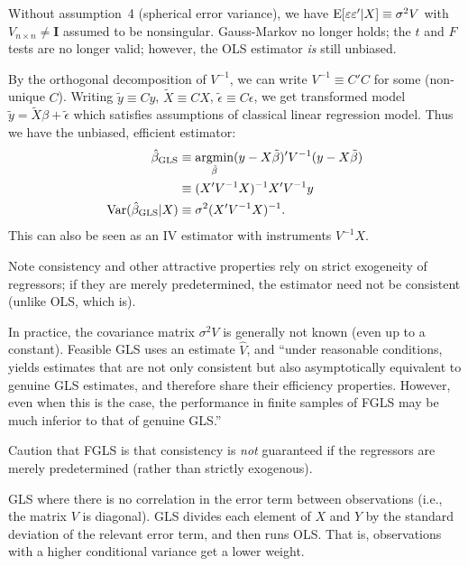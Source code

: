 \documentclass[8pt,letterpaper, landscape]{extarticle} %
\newcommand{\mI}{\ensuremath{\mathbf{I}}}
\begin{document}
\begin{multicols}{3}
\begin{description}
 Without assumption~4 (spherical error variance), we have $ \operatorname{E} [\varepsilon \varepsilon' | X] \equiv \sigma^2 V $ with $ V_{n \times n} \neq \mI $ assumed to be nonsingular. Gauss-Markov no longer holds; the $ t $ and $ F $ tests are no longer valid; however, the OLS estimator \textit{is} still unbiased.

By the orthogonal decomposition of $ V^{-1} $, we can write $ V^{-1} \equiv C' C $ for some (non-unique $ C $). Writing $ \tilde{y} \equiv Cy $, $ \tilde{X} \equiv CX $, $ \tilde{\epsilon} \equiv C \epsilon $, we get transformed model $ \tilde{y} = \tilde{X} \beta + \tilde{\epsilon} $ which satisfies assumptions of classical linear regression model. Thus we have the unbiased, efficient estimator:
\begin{align*}
\hat{\beta}_{\text{GLS}} &\equiv \operatorname*{argmin}_{\tilde{\beta}} (y - X \tilde{\beta})' V^{-1} (y - X \tilde{\beta}) \\
&\equiv (X' V^{-1} X)^{-1} X' V^{-1} y \\
\operatorname{Var} (\hat{\beta}_{\text{GLS}} | X) &\equiv \sigma^{2} (X' V^{-1} X)^{-1}.
\end{align*}
This can also be seen as an IV estimator with instruments $ V^{-1} X $.

Note consistency and other attractive properties rely on strict exogeneity of regressors; if they are merely predetermined, the estimator need not be consistent (unlike OLS, which is).

 In practice, the covariance matrix $ \sigma^2 V $ is generally not known (even up to a constant). Feasible GLS uses an estimate $ \widehat{V} $, and ``under reasonable conditions, yields estimates that are not only consistent but also asymptotically equivalent to genuine GLS estimates, and therefore share their efficiency properties. However, even when this is the case, the performance in finite samples of FGLS may be much inferior to that of genuine GLS.''

Caution that FGLS is that consistency is \textit{not} guaranteed if the regressors are merely predetermined (rather than strictly exogenous).

 GLS where there is no correlation in the error term between observations (i.e., the matrix $ V $ is diagonal). GLS divides each element of $ X $ and $ Y $ by the standard deviation of the relevant error term, and then runs OLS. That is, observations with a higher conditional variance get a lower weight.


\end{description}
\end{multicols}
\end{document}
